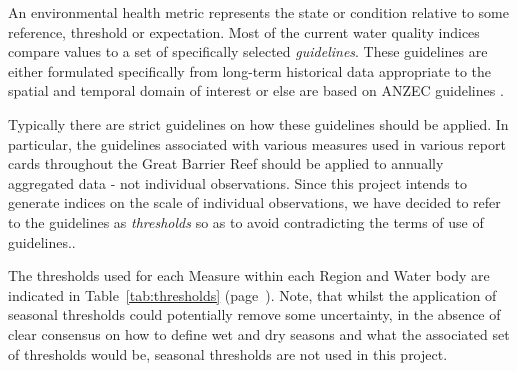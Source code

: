An environmental health metric represents the state or condition relative to some reference,
threshold or expectation.  Most of the current water quality indices compare values to a set of
specifically selected \textit{guidelines}.  These guidelines are either formulated specifically from
long-term historical data appropriate to the spatial and temporal domain of interest or else are
based on ANZEC guidelines \citep{ANZEC-2000}.
 
Typically there are strict guidelines on how these guidelines should be applied.  In particular, the
guidelines associated with various measures used in various report cards throughout the Great
Barrier Reef should be applied to annually aggregated data - not individual observations.  Since
this project intends to generate indices on the scale of individual observations, we have decided to
refer to the guidelines as \textit{thresholds} so as to avoid contradicting the terms of use of
guidelines..
 
The thresholds used for each Measure within each Region and Water body are indicated in
Table~\ref{tab:thresholds} (page~\pageref{tab:thresholds}).  Note, that whilst the application of
seasonal thresholds could potentially remove some uncertainty, in the absence of clear consensus on
how to define wet and dry seasons and what the associated set of thresholds would be, seasonal
thresholds are not used in this project.
